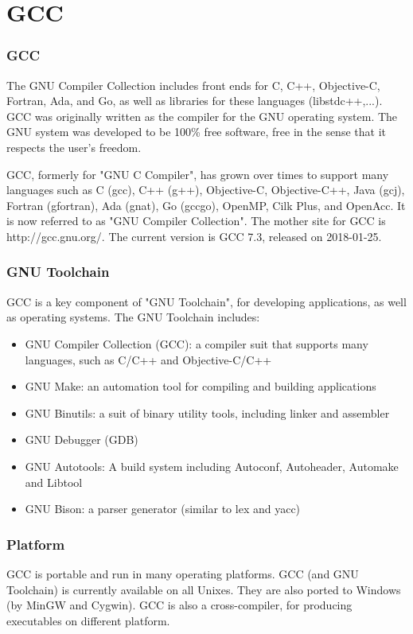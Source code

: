 \documentclass{beamer}
\begin{document}
\section{GCC}
\begin{frame}
\frametitle{GCC}
The GNU Compiler Collection includes front ends for C, C++, Objective-C, Fortran, Ada, and Go, as well as libraries for these languages (libstdc++,...). GCC was originally written as the compiler for the GNU operating system. The GNU system was developed to be 100\% free software, free in the sense that it respects the user's freedom.

GCC, formerly for "GNU C Compiler", has grown over times to support many languages such as C (gcc), C++ (g++), Objective-C, Objective-C++, Java (gcj), Fortran (gfortran), Ada (gnat), Go (gccgo), OpenMP, Cilk Plus, and OpenAcc. It is now referred to as "GNU Compiler Collection". The mother site for GCC is http://gcc.gnu.org/. The current version is GCC 7.3, released on 2018-01-25.
\end{frame}
\begin{frame}
\frametitle{GNU Toolchain}
GCC is a key component of "GNU Toolchain", for developing applications, as well as operating systems. The GNU Toolchain includes:
\begin{itemize}
\item GNU Compiler Collection (GCC): a compiler suit that supports many languages, such as C/C++ and Objective-C/C++
\item GNU Make: an automation tool for compiling and building applications
\item GNU Binutils: a suit of binary utility tools, including linker and assembler
\item GNU Debugger (GDB)
\item GNU Autotools: A build system including Autoconf, Autoheader, Automake and Libtool
\item GNU Bison: a parser generator (similar to lex and yacc)
\end{itemize}
\end{frame}
\begin{frame}
\frametitle{Platform}
GCC is portable and run in many operating platforms. GCC (and GNU Toolchain) is currently available on all Unixes. They are also ported to Windows (by MinGW and Cygwin). GCC is also a cross-compiler, for producing executables on different platform.
\end{frame}
\end{document}
